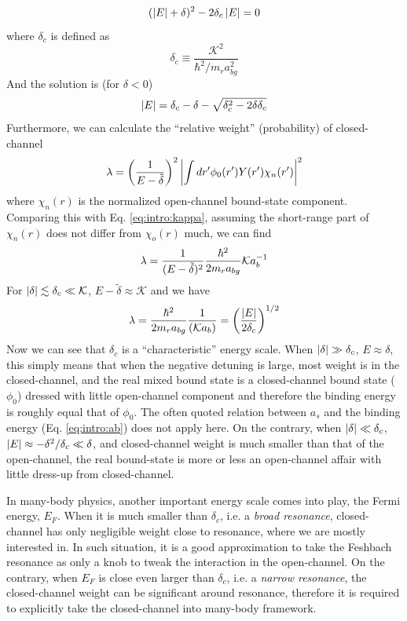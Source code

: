 \begin{equation}
(\left\lvert{E}\right\rvert+\delta)^{2}-2\delta_{c}\left\lvert{E}\right\rvert=0
\end{equation}
where $\delta_{c}$ is defined as 
\begin{equation}\label{eq:intro:deltaC}
\delta_{c}\equiv\frac{\mathcal{K}^{2}}{\hbar^{2}/m_{r}a_{bg}^{2}}
\end{equation}
And the solution is  (for $\delta<0$)
\begin{equation}
\left\lvert{E}\right\rvert=\delta_{c}-\delta-\sqrt{\delta_{c}^{2}-2\delta\delta_{c}}
\end{equation}
Furthermore, we can calculate the ``relative weight'' (probability) of closed-channel 
\begin{equation}
\lambda=\left(\frac{1}{E-\tilde\delta}\right)^{2}\left\lvert{\int{}dr'\phi_{0}(r')Y(r')\chi_{n}(r')}\right\rvert^{2}
\end{equation}
where $\chi_{n}(r)$ is the normalized open-channel bound-state component.  Comparing this with Eq. \ref{eq:intro:kappa}, assuming the short-range part of $\chi_{n}(r)$ does not differ from $\chi_{o}(r)$ much, we can find 
\begin{equation}
\lambda=\frac{1}{(E-\tilde\delta)^{2}}\frac{\hbar^{2}}{2m_{r}a_{bg}}\mathcal{K}a_{b}^{-1}
\end{equation}
For $\left\lvert{\delta}\right\rvert\lesssim\delta_{c}\ll\mathcal{K}$, $E-\tilde\delta\approx\mathcal{K}$ and we have 
\begin{equation}
\lambda=\frac{\hbar^{2}}{2m_{r}a_{bg}}\frac{1}{(\mathcal{K}a_{b})}=\left(\frac{\left\lvert{E}\right\rvert}{2\delta_{c}}\right)^{1/2}
\end{equation}
Now we can see that  $\delta_{c}$ is a ``characteristic'' energy scale. When $\left\lvert{\delta}\right\rvert\gg\delta_{c}$, $E\approx\delta$, this simply means that when the negative detuning is large, most weight is in the closed-channel, and the real mixed bound state is a closed-channel bound state ($\phi_{0}$) dressed with little open-channel component and therefore the binding energy is roughly equal that of $\phi_{0}$.  The often quoted relation between $a_{s}$ and the binding energy (Eq. \ref{eq:intro:ab}) does not apply here.  On the contrary, when $\left\lvert{\delta}\right\rvert\ll\delta_{c}$, $\left\lvert{E}\right\rvert\approx-\delta^{2}/\delta_{c}\ll\delta$,  and closed-channel weight is much smaller than that of the open-channel, the real bound-state is more or less an open-channel affair with little dress-up from closed-channel.  %

In many-body physics, another important energy scale comes into play, the Fermi energy, $E_{F}$.  When it is much smaller than $\delta_{c}$, i.e. a \emph{broad resonance},  closed-channel has only negligible weight close to resonance, where we are mostly interested in. In such situation, it is a good approximation to take the Feshbach resonance as only a knob to tweak the interaction in the open-channel.  On the contrary, when $E_{F}$ is close even larger than $\delta_{c}$, i.e. a \emph{narrow resonance}, the closed-channel weight can be  significant around resonance, therefore it is required to explicitly take the closed-channel into many-body framework.  










